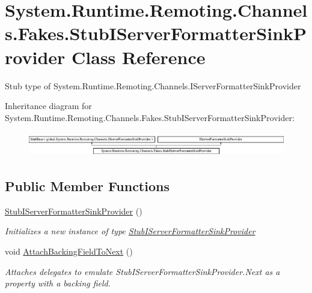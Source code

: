 \hypertarget{class_system_1_1_runtime_1_1_remoting_1_1_channels_1_1_fakes_1_1_stub_i_server_formatter_sink_provider}{\section{System.\-Runtime.\-Remoting.\-Channels.\-Fakes.\-Stub\-I\-Server\-Formatter\-Sink\-Provider Class Reference}
\label{class_system_1_1_runtime_1_1_remoting_1_1_channels_1_1_fakes_1_1_stub_i_server_formatter_sink_provider}
}


Stub type of System.\-Runtime.\-Remoting.\-Channels.\-I\-Server\-Formatter\-Sink\-Provider 


Inheritance diagram for System.\-Runtime.\-Remoting.\-Channels.\-Fakes.\-Stub\-I\-Server\-Formatter\-Sink\-Provider\-:\begin{figure}[H]
\begin{center}
\leavevmode
\includegraphics[height=1.102362cm]{class_system_1_1_runtime_1_1_remoting_1_1_channels_1_1_fakes_1_1_stub_i_server_formatter_sink_provider}
\end{center}
\end{figure}
\subsection*{Public Member Functions}
\begin{DoxyCompactItemize}
\item 
\hyperlink{class_system_1_1_runtime_1_1_remoting_1_1_channels_1_1_fakes_1_1_stub_i_server_formatter_sink_provider_aaf020bcf506126b107b704b83177a227}{Stub\-I\-Server\-Formatter\-Sink\-Provider} ()
\begin{DoxyCompactList}\small\item\em Initializes a new instance of type \hyperlink{class_system_1_1_runtime_1_1_remoting_1_1_channels_1_1_fakes_1_1_stub_i_server_formatter_sink_provider}{Stub\-I\-Server\-Formatter\-Sink\-Provider}\end{DoxyCompactList}\item 
void \hyperlink{class_system_1_1_runtime_1_1_remoting_1_1_channels_1_1_fakes_1_1_stub_i_server_formatter_sink_provider_aca072d123ce9848d86c29da9bb95c348}{Attach\-Backing\-Field\-To\-Next} ()
\begin{DoxyCompactList}\small\item\em Attaches delegates to emulate Stub\-I\-Server\-Formatter\-Sink\-Provider.\-Next as a property with a backing field.\end{DoxyCompactList}\end{DoxyCompactItemize}

